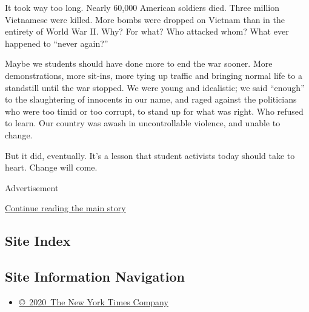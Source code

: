 It took way too long. Nearly 60,000 American soldiers died. Three
million Vietnamese were killed. More bombs were dropped on Vietnam than
in the entirety of World War II. Why? For what? Who attacked whom? What
ever happened to ``never again?''

Maybe we students should have done more to end the war sooner. More
demonstrations, more sit-ins, more tying up traffic and bringing normal
life to a standstill until the war stopped. We were young and
idealistic; we said ``enough'' to the slaughtering of innocents in our
name, and raged against the politicians who were too timid or too
corrupt, to stand up for what was right. Who refused to learn. Our
country was awash in uncontrollable violence, and unable to change.

But it did, eventually. It's a lesson that student activists today
should take to heart. Change will come.

Advertisement

\protect\hyperlink{after-bottom}{Continue reading the main story}

\hypertarget{site-index}{%
\subsection{Site Index}\label{site-index}}

\hypertarget{site-information-navigation}{%
\subsection{Site Information
Navigation}\label{site-information-navigation}}

\begin{itemize}
\tightlist
\item
  \href{https://help.nytimes.com/hc/en-us/articles/115014792127-Copyright-notice}{©~2020~The
  New York Times Company}
\end{itemize}

